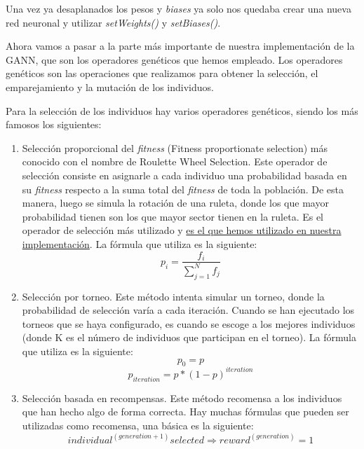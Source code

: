 Una vez ya desaplanados los pesos y \textit{biases} ya solo nos quedaba crear una nueva red neuronal y utilizar \textit{setWeights()} y \textit{setBiases()}.

Ahora vamos a pasar a la parte más importante de nuestra implementación de la GANN, que son los operadores genéticos que hemos empleado. Los operadores genéticos son las operaciones que realizamos para obtener la selección, el emparejamiento y la mutación de los individuos.

Para la selección de los individuos hay varios operadores genéticos, siendo los más famosos los siguientes:

\begin{enumerate}
    \item Selección proporcional del \textit{fitness} (Fitness proportionate selection) más conocido con el nombre de Roulette Wheel Selection. Este operador de selección consiste en asignarle a cada individuo una probabilidad basada en su \textit{fitness} respecto a la suma total del \textit{fitness} de toda la población. De esta manera, luego se simula la rotación de una ruleta, donde los que mayor probabilidad tienen son los que mayor sector tienen en la ruleta. Es el operador de selección más utilizado y \underline{es el que hemos utilizado en nuestra implementación}. La fórmula que utiliza es la siguiente:
    \[p_{i}=\dfrac{f_{i}}{\sum_{j=1}^{N}{f_{j}}}\]
    \item Selección por torneo. Este método intenta simular un torneo, donde la probabilidad de selección varía a cada iteración. Cuando se han ejecutado los torneos que se haya configurado, es cuando se escoge a los mejores individuos (donde K es el número de individuos que participan en el torneo). La fórmula que utiliza es la siguiente:
    \[p_{0}=p\]
    \[p_{iteration}=p*(1-p)^{iteration}\]
    \item Selección basada en recompensas. Este método recomensa a los individuos que han hecho algo de forma correcta. Hay muchas fórmulas que pueden ser utilizadas como recomensa, una básica es la siguiente:
    \[individual^{(generation + 1)} selected \Rightarrow reward^{(generation)} = 1\]
\end{enumerate}

